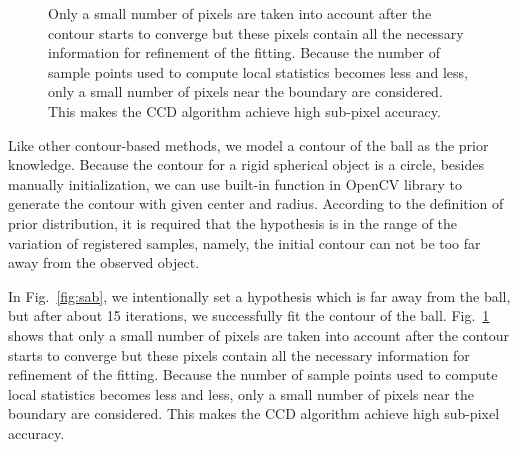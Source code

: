 \begin{figure}[htbp]
\begin{minipage}[t]{0.5\linewidth}
  \end{minipage} 
  \begin{minipage}[t]{0.5\linewidth} 
    \centering 
  \end{minipage} 
\caption[Pixels used in each iteration]{Only a small number of pixels are taken into account after the
contour starts to converge but these pixels contain all the
necessary information for refinement of the fitting. Because the
number of sample points used to compute local statistics 
becomes less and less, only a small number of pixels near the boundary
are considered. This makes the CCD algorithm achieve high
sub-pixel accuracy.}
\label{fig:pon}
\end{figure}
Like other contour-based methods, we model a contour of the ball as the
prior knowledge. Because the contour for a rigid spherical object is a
circle, besides manually initialization, we can use built-in function in
OpenCV library to generate the contour with given center and
radius. According to the definition of prior distribution, it is required
that the hypothesis is in the range of the variation of
registered samples, namely, the initial contour can not be too far away
from the observed object.

In Fig.~\ref{fig:sab}, we intentionally set a hypothesis which is far away
from the ball, but after about 15 iterations, we successfully fit the
contour of the ball. %
Fig.~\ref{fig:pon} shows
that only a small number of pixels are taken into account after the
contour starts to converge but these pixels contain all the
necessary information for refinement of the fitting. Because the
number of sample points used to compute local statistics 
becomes less and less, only a small number of pixels near the boundary
are considered. This makes the CCD algorithm achieve high
sub-pixel accuracy.

